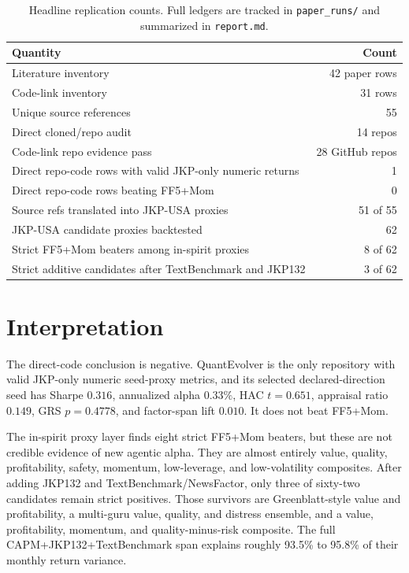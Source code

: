 \documentclass[11pt]{article}
\begin{document}
\begin{table}[h]
\centering
\begin{tabular}{lr}
\toprule
Quantity & Count \\
\midrule
Literature inventory & 42 paper rows \\
Code-link inventory & 31 rows \\
Unique source references & 55 \\
Direct cloned/repo audit & 14 repos \\
Code-link repo evidence pass & 28 GitHub repos \\
Direct repo-code rows with valid JKP-only numeric returns & 1 \\
Direct repo-code rows beating FF5+Mom & 0 \\
Source refs translated into JKP-USA proxies & 51 of 55 \\
JKP-USA candidate proxies backtested & 62 \\
Strict FF5+Mom beaters among in-spirit proxies & 8 of 62 \\
Strict additive candidates after TextBenchmark and JKP132 & 3 of 62 \\
\bottomrule
\end{tabular}
\caption{Headline replication counts. Full ledgers are tracked in
\texttt{paper\_runs/} and summarized in \texttt{report.md}.}
\end{table}

\section{Interpretation}

The direct-code conclusion is negative. QuantEvolver is the only repository with
valid JKP-only numeric seed-proxy metrics, and its selected declared-direction
seed has Sharpe \(0.316\), annualized alpha \(0.33\%\), HAC \(t=0.651\), appraisal
ratio \(0.149\), GRS \(p=0.4778\), and factor-span lift \(0.010\). It does not
beat FF5+Mom.

The in-spirit proxy layer finds eight strict FF5+Mom beaters, but these are not
credible evidence of new agentic alpha. They are almost entirely value, quality,
profitability, safety, momentum, low-leverage, and low-volatility composites.
After adding JKP132 and TextBenchmark/NewsFactor, only three of sixty-two
candidates remain strict positives. Those survivors are Greenblatt-style value
and profitability, a multi-guru value, quality, and distress ensemble, and a
value, profitability, momentum, and quality-minus-risk composite. The full
CAPM+JKP132+TextBenchmark span explains roughly 93.5\% to 95.8\% of their monthly
return variance.
\end{document}
